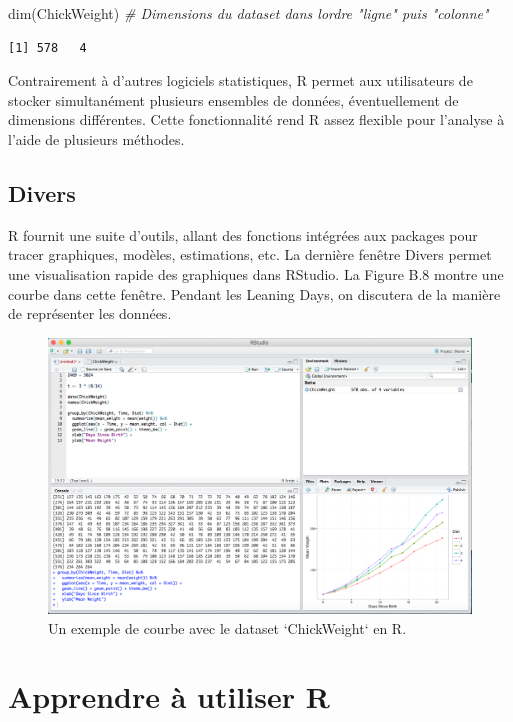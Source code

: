 \documentclass[
  12pt,
]{book}
\newenvironment{Shaded}{\begin{snugshade}}{\end{snugshade}}
\newcommand{\CommentTok}[1]{\textcolor[rgb]{0.56,0.35,0.01}{\textit{#1}}}
\newcommand{\FunctionTok}[1]{\textcolor[rgb]{0.00,0.00,0.00}{#1}}
\newcommand{\NormalTok}[1]{#1}
\begin{document}
\begin{Shaded}
\begin{Highlighting}[]
\FunctionTok{dim}\NormalTok{(ChickWeight) }\CommentTok{\# Dimensions du dataset dans l\textquotesingle{}ordre "ligne" puis "colonne"}
\end{Highlighting}
\end{Shaded}

\begin{verbatim}
[1] 578   4
\end{verbatim}

Contrairement à d'autres logiciels statistiques, R permet aux utilisateurs de stocker simultanément plusieurs ensembles de données, éventuellement de dimensions différentes. Cette fonctionnalité rend R assez flexible pour l'analyse à l'aide de plusieurs méthodes.

\hypertarget{divers}{%
\subsection{Divers}\label{divers}}

R fournit une suite d'outils, allant des fonctions intégrées aux packages pour tracer graphiques, modèles, estimations, etc. La dernière fenêtre Divers permet une visualisation rapide des graphiques dans RStudio. La Figure B.8 montre une courbe dans cette fenêtre. Pendant les Leaning Days, on discutera de la manière de représenter les données.

\begin{figure}
\includegraphics[width=0.6\linewidth]{Images/graph} \caption{Un exemple de courbe avec le dataset `ChickWeight` en R.}\label{fig:graph}
\end{figure}

\hypertarget{apprendre-uxe0-utiliser-r}{%
\section{Apprendre à utiliser R}\label{apprendre-uxe0-utiliser-r}}
\end{document}
